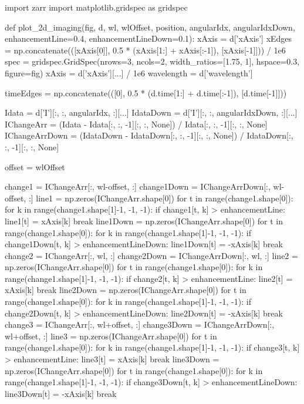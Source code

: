 \begin{pycode}[2DRT]
import zarr
import matplotlib.gridspec as gridspec


def plot_2d_imaging(fig, d, wl, wlOffset, position, angularIdx,
                    angularIdxDown, enhancementLine=0.4, enhancementLineDown=0.1):
    xAxis = d['xAxis']
    xEdges = np.concatenate(([xAxis[0]], 0.5 * (xAxis[1:] + xAxis[:-1]), [xAxis[-1]])) / 1e6
    spec = gridspec.GridSpec(nrows=3, ncols=2, width_ratios=[1.75, 1], hspace=0.3, figure=fig)
    xAxis = d['xAxis'][...] / 1e6
    wavelength = d['wavelength']

    timeEdges = np.concatenate(([0],
                                0.5 * (d.time[1:] + d.time[:-1]),
                                [d.time[-1]]))

    Idata = d['I'][:, :, angularIdx, :][...]
    IdataDown = d['I'][:, :, angularIdxDown, :][...]
    IChangeArr = (Idata - Idata[:, :, -1][:, :, None]) / Idata[:, :, -1][:, :, None]
    IChangeArrDown = (IdataDown - IdataDown[:, :, -1][:, :, None]) / IdataDown[:, :, -1][:, :, None]

    offset = wlOffset

    change1 = IChangeArr[:, wl-offset, :]
    change1Down = IChangeArrDown[:, wl-offset, :]
    line1 = np.zeros(IChangeArr.shape[0])
    for t in range(change1.shape[0]):
        for k in range(change1.shape[1]-1, -1, -1):
            if change1[t, k] > enhancementLine:
                line1[t] = xAxis[k]
                break
    line1Down = np.zeros(IChangeArr.shape[0])
    for t in range(change1.shape[0]):
        for k in range(change1.shape[1]-1, -1, -1):
            if change1Down[t, k] > enhancementLineDown:
                line1Down[t] = -xAxis[k]
                break
    change2 = IChangeArr[:, wl, :]
    change2Down = IChangeArrDown[:, wl, :]
    line2 = np.zeros(IChangeArr.shape[0])
    for t in range(change1.shape[0]):
        for k in range(change1.shape[1]-1, -1, -1):
            if change2[t, k] > enhancementLine:
                line2[t] = xAxis[k]
                break
    line2Down = np.zeros(IChangeArr.shape[0])
    for t in range(change1.shape[0]):
        for k in range(change1.shape[1]-1, -1, -1):
            if change2Down[t, k] > enhancementLineDown:
                line2Down[t] = -xAxis[k]
                break
    change3 = IChangeArr[:, wl+offset, :]
    change3Down = IChangeArrDown[:, wl+offset, :]
    line3 = np.zeros(IChangeArr.shape[0])
    for t in range(change1.shape[0]):
        for k in range(change1.shape[1]-1, -1, -1):
            if change3[t, k] > enhancementLine:
                line3[t] = xAxis[k]
                break
    line3Down = np.zeros(IChangeArr.shape[0])
    for t in range(change1.shape[0]):
        for k in range(change1.shape[1]-1, -1, -1):
            if change3Down[t, k] > enhancementLineDown:
                line3Down[t] = -xAxis[k]
                break


\end{pycode}
